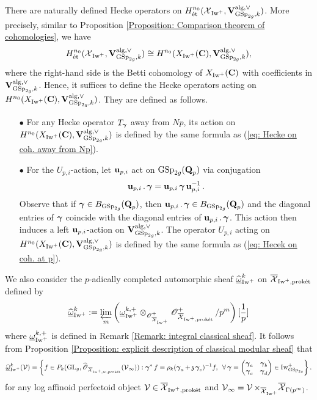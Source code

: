 \begin{Remark}\label{Remark: Hecke operators for alg. rep.}
\normalfont There are naturally defined Hecke operators on $H_{\et}^{n_0}(\calX_{\Iw^+}, \V_{\GSp_{2g}, k}^{\alg, \vee})$. More precisely, similar to Proposition \ref{Proposition: Comparison theorem of cohomologies}, we have \[
    H_{\et}^{n_0}(\calX_{\Iw^+}, \V_{\GSp_{2g}, k}^{\alg, \vee}) \cong H^{n_0}(X_{\Iw^+}(\C), \V_{\GSp_{2g}, k}^{\alg, \vee}),
\] where the right-hand side is the Betti cohomology of $X_{\Iw^+}(\C)$ with coefficients in $\V_{\GSp_{2g}, k}^{\alg, \vee}$. Hence, it suffices to define the Hecke operators acting on $H^{n_0}(X_{\Iw^+}(\C), \V_{\GSp_{2g}, k}^{\alg, \vee})$. They are defined as follows. \begin{enumerate}
    \item[$\bullet$] For any Hecke operator $T_{\bfgamma}$ away from $Np$, its action on $H^{n_0}(X_{\Iw^+}(\C), \V_{\GSp_{2g}, k}^{\alg, \vee})$ is defined by the same formula as (\ref{eq: Hecke on coh. away from Np}).
    \item[$\bullet$] For the $U_{p,i}$-action, let $\bfu_{p,i}$ act on $\GSp_{2g}(\Q_p)$ via conjugation \[
        \bfu_{p,i} . \bfgamma = \bfu_{p,i} \bfgamma \bfu_{p,i}^{-1}.
    \] Observe that if $\bfgamma\in B_{\GSp_{2g}}(\Q_p)$, then $\bfu_{p,i} . \bfgamma \in B_{\GSp_{2g}}(\Q_p)$ and the diagonal entries of $\bfgamma$ coincide with the diagonal entries of $\bfu_{p,i} . \bfgamma$. This action then induces a left $\bfu_{p,i}$-action on $\V_{\GSp_{2g}, k}^{\alg, \vee}$. The operator $U_{p,i}$ acting on $H^{n_0}(X_{\Iw^+}(\C), \V_{\GSp_{2g}, k}^{\alg, \vee})$ is defined by the same formula as (\ref{eq: Hecek on coh. at p}). 
\end{enumerate} 
\end{Remark}

We also consider the $p$-adically completed automorphic sheaf $\widehat{\underline{\omega}}_{\Iw^+}^{k}$ on $\overline{\calX}_{\Iw^+, \proket}$ defined by
$$
        \widehat{\underline{\omega}}_{\Iw^+}^{k} := \varprojlim_m\left(\underline{\omega}_{\Iw^+}^{k,+}\otimes_{\scrO^+_{\overline{\calX}_{\Iw^+}}}\scrO^+_{\overline{\calX}_{\Iw^+, \proket}}/p^m\right)[\frac{1}{p}]
$$
where $\underline{\omega}_{\Iw^+}^{k,+}$ is defined in Remark \ref{Remark: integral classical sheaf}. It follows from Proposition \ref{Proposition: explicit description of classical modular sheaf} that 
$$
        \widehat{\underline{\omega}}_{\Iw^+}^{k}(\calV) = \left\{f \in P_k(\GL_g, \widehat{\scrO}_{\overline{\calX}_{\Iw^+, w, \proket}}(\calV_{\infty})) :  \bfgamma^* f = \rho_{k}(\bfgamma_a+\frakz\bfgamma_c)^{-1}f, \,\,\,\forall \bfgamma = \begin{pmatrix}\bfgamma_a & \bfgamma_b\\ \bfgamma_c & \bfgamma_d\end{pmatrix} \in \Iw_{\GSp_{2g}}^+ 
        \right\}.
$$
for any log affinoid perfectoid object $\calV\in \overline{\calX}_{\Iw^+, \proket}$ and $\calV_{\infty} = \calV \times_{\overline{\calX}_{\Iw^+}}\overline{\calX}_{\Gamma(p^{\infty})}$.


